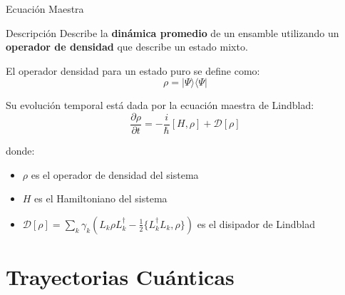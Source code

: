 \documentclass[aspectratio=169]{beamer}
\newcommand{\ket}[1]{\lvert #1 \rangle}
\newcommand{\bra}[1]{\langle #1 \rvert}
\begin{document}
\begin{frame}{Ecuación Maestra}

\begin{block}{Descripción}
Describe la \textbf{dinámica promedio} de un ensamble utilizando un \textbf{operador de densidad} que describe un estado mixto.
\end{block}

\vspace{0.2cm}

El operador densidad para un estado puro se define como:
\[
\rho = \ket{\Psi}\bra{\Psi}
\]

\vspace{0.2cm}

Su evolución temporal está dada por la ecuación maestra de Lindblad:
\[
\boxed{\frac{\partial \rho}{\partial t} = -\frac{i}{\hbar} \left[ H, \rho \right] + \mathcal{D}[\rho]}
\]

\vspace{0.2cm}

donde:
\begin{itemize}
\item $\rho$ es el operador de densidad del sistema
\item $H$ es el Hamiltoniano del sistema
\item $\mathcal{D}[\rho] = \sum_k \gamma_k \left( L_k \rho L_k^\dagger - \frac{1}{2} \{L_k^\dagger L_k, \rho\} \right)$ es el disipador de Lindblad
\end{itemize}

\end{frame}

\section{Trayectorias Cuánticas}
\end{document}
